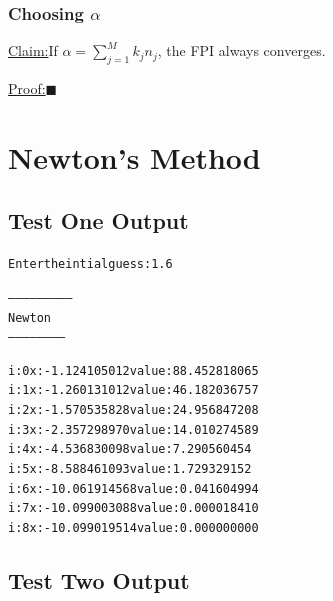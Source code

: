 \documentclass[11pt]{article} %
\newenvironment{claim}[1]{\par\noindent\underline{Claim:}\space#1}{}
\newenvironment{proof}[1]{\par\noindent\underline{Proof:}\space#1}{\hfill $\blacksquare$}
\begin{document}
\subsubsection*{Choosing $\alpha$}


\begin{claim}
If $\alpha  = \sum_{j=1}^M k_jn_j$, the FPI always converges.
\end{claim}
\begin{proof}
\end{proof}


\section*{Newton's Method}

\subsection*{Test One Output}
\begin{alltt}
Enter the intial guess: 1.6

--------------------------
 Newton
 -----------------------


i: 0	x: -1.124105012	value: 88.452818065
i: 1	x: -1.260131012	value: 46.182036757
i: 2	x: -1.570535828	value: 24.956847208
i: 3	x: -2.357298970	value: 14.010274589
i: 4	x: -4.536830098	value: 7.290560454
i: 5	x: -8.588461093	value: 1.729329152
i: 6	x: -10.061914568	value: 0.041604994
i: 7	x: -10.099003088	value: 0.000018410
i: 8	x: -10.099019514	value: 0.000000000

\end{alltt}

\subsection*{Test Two Output}
\end{document}
